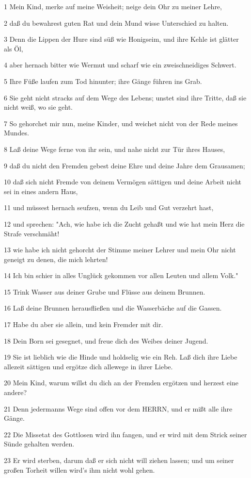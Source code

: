 \par 1 Mein Kind, merke auf meine Weisheit; neige dein Ohr zu meiner Lehre,
\par 2 daß du bewahrest guten Rat und dein Mund wisse Unterschied zu halten.
\par 3 Denn die Lippen der Hure sind süß wie Honigseim, und ihre Kehle ist glätter als Öl,
\par 4 aber hernach bitter wie Wermut und scharf wie ein zweischneidiges Schwert.
\par 5 Ihre Füße laufen zum Tod hinunter; ihre Gänge führen ins Grab.
\par 6 Sie geht nicht stracks auf dem Wege des Lebens; unstet sind ihre Tritte, daß sie nicht weiß, wo sie geht.
\par 7 So gehorchet mir nun, meine Kinder, und weichet nicht von der Rede meines Mundes.
\par 8 Laß deine Wege ferne von ihr sein, und nahe nicht zur Tür ihres Hauses,
\par 9 daß du nicht den Fremden gebest deine Ehre und deine Jahre dem Grausamen;
\par 10 daß sich nicht Fremde von deinem Vermögen sättigen und deine Arbeit nicht sei in eines andern Haus,
\par 11 und müssest hernach seufzen, wenn du Leib und Gut verzehrt hast,
\par 12 und sprechen: "Ach, wie habe ich die Zucht gehaßt und wie hat mein Herz die Strafe verschmäht!
\par 13 wie habe ich nicht gehorcht der Stimme meiner Lehrer und mein Ohr nicht geneigt zu denen, die mich lehrten!
\par 14 Ich bin schier in alles Unglück gekommen vor allen Leuten und allem Volk."
\par 15 Trink Wasser aus deiner Grube und Flüsse aus deinem Brunnen.
\par 16 Laß deine Brunnen herausfließen und die Wasserbäche auf die Gassen.
\par 17 Habe du aber sie allein, und kein Fremder mit dir.
\par 18 Dein Born sei gesegnet, und freue dich des Weibes deiner Jugend.
\par 19 Sie ist lieblich wie die Hinde und holdselig wie ein Reh. Laß dich ihre Liebe allezeit sättigen und ergötze dich allewege in ihrer Liebe.
\par 20 Mein Kind, warum willst du dich an der Fremden ergötzen und herzest eine andere?
\par 21 Denn jedermanns Wege sind offen vor dem HERRN, und er mißt alle ihre Gänge.
\par 22 Die Missetat des Gottlosen wird ihn fangen, und er wird mit dem Strick seiner Sünde gehalten werden.
\par 23 Er wird sterben, darum daß er sich nicht will ziehen lassen; und um seiner großen Torheit willen wird's ihm nicht wohl gehen.

